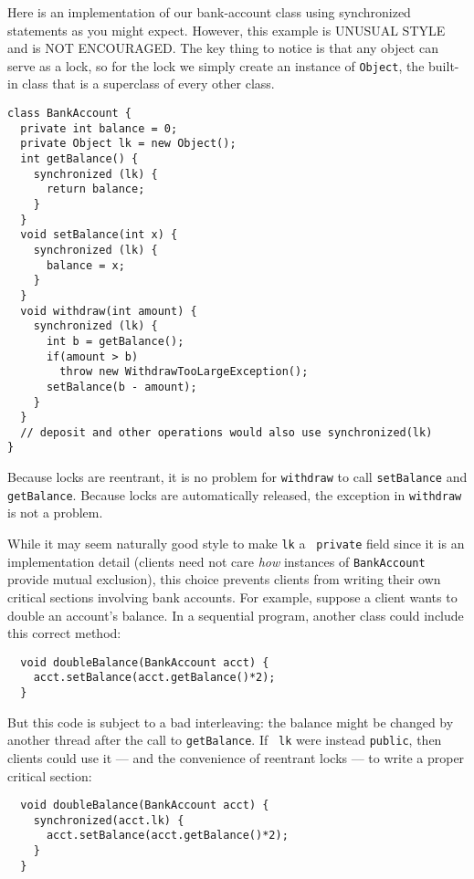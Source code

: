 \documentclass[10pt]{article}
\begin{document}
Here is an implementation of our bank-account class using synchronized
statements as you might expect.  However, this example is UNUSUAL
STYLE and is NOT ENCOURAGED.  The key thing to notice is that any
object can serve as a lock, so for the lock we simply create an
instance of {\tt Object}, the built-in class that is a superclass of
every other class.
\begin{verbatim}
class BankAccount {
  private int balance = 0;
  private Object lk = new Object();
  int getBalance() { 
    synchronized (lk) { 
      return balance; 
    } 
  }
  void setBalance(int x) { 
    synchronized (lk) { 
      balance = x; 
    } 
  } 
  void withdraw(int amount) {
    synchronized (lk) {
      int b = getBalance();
      if(amount > b)
        throw new WithdrawTooLargeException();
      setBalance(b - amount);
    } 
  }
  // deposit and other operations would also use synchronized(lk)
}
\end{verbatim}
Because locks are reentrant, it is no problem for {\tt withdraw} to
call {\tt setBalance} and {\tt getBalance}.  Because locks are
automatically released, the exception in {\tt withdraw} is not a
problem.

While it may seem naturally good style to make {\tt lk} a {\tt
  private} field since it is an implementation detail (clients need
not care \emph{how} instances of {\tt BankAccount} provide mutual
exclusion), this choice prevents clients from writing their own
critical sections involving bank accounts. For example, suppose a
client wants to double an account's balance.  In a sequential program,
another class could include this correct method:
\begin{verbatim}
  void doubleBalance(BankAccount acct) {
    acct.setBalance(acct.getBalance()*2);
  }
\end{verbatim}
But this code is subject to a bad interleaving: the balance might be
changed by another thread after the call to {\tt getBalance}.  If {\tt
  lk} were instead {\tt public}, then clients could use it --- and the
convenience of reentrant locks --- to write a proper critical
section:
\begin{verbatim}
  void doubleBalance(BankAccount acct) {
    synchronized(acct.lk) {
      acct.setBalance(acct.getBalance()*2);
    }
  }
\end{verbatim}
\end{document}
